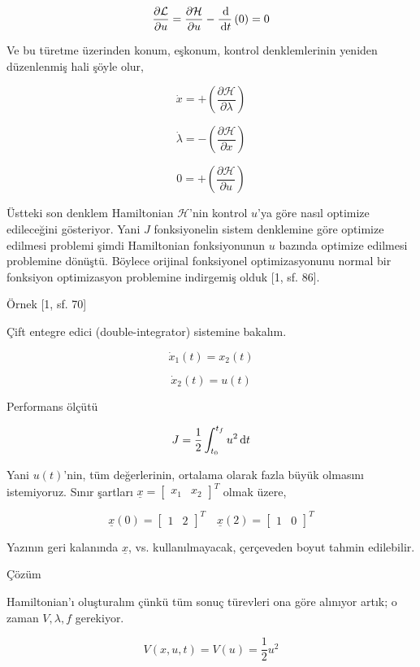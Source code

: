 \documentclass[12pt,fleqn]{article}\usepackage{../../common}
\begin{document}
$$
\frac{\partial \mathcal{L}}{\partial u} = 
\frac{\partial \mathcal{H}}{\partial u} - 
\frac{\,\mathrm{d}}{\,\mathrm{d} t} \left( 0 \right)   = 0
$$

Ve bu türetme üzerinden konum, eşkonum, kontrol denklemlerinin yeniden
düzenlenmiş hali şöyle olur,

$$
\dot{x} = + \left( \frac{\partial \mathcal{H}}{\partial \lambda} \right)
$$

$$
\dot{\lambda} = - \left( \frac{\partial \mathcal{H}}{\partial x} \right)
$$

$$
0 = + \left( \frac{\partial \mathcal{H}}{\partial u} \right)
$$


Üstteki son denklem Hamiltonian $\mathcal{H}$'nin kontrol $u$'ya göre
nasıl optimize edileceğini gösteriyor. Yani $J$ fonksiyonelin sistem
denklemine göre optimize edilmesi problemi şimdi Hamiltonian
fonksiyonunun $u$ bazında optimize edilmesi problemine
dönüştü. Böylece orijinal fonksiyonel optimizasyonunu normal bir
fonksiyon optimizasyon problemine indirgemiş olduk [1, sf. 86].

Örnek [1, sf. 70]

Çift entegre edici (double-integrator) sistemine bakalım. 

$$
\dot{x}_1(t) = x_2(t)
$$

$$
\dot{x}_2(t) = u(t)
$$

Performans ölçütü 

$$
J = \frac{1}{2} \int_{t_0}^{t_f} u^2 \,\mathrm{d} t
$$

Yani $u(t)$'nin, tüm değerlerinin, ortalama olarak fazla büyük
olmasını istemiyoruz. Sınır şartları $\underline{x} =
\left[\begin{array}{cc} x_1 & x_2 \end{array}\right]^T$ 
olmak üzere,

$$
\underline{x}(0) = \left[\begin{array}{cc} 1 & 2 \end{array}\right]^T \quad 
\underline{x}(2) = \left[\begin{array}{cc} 1 & 0 \end{array}\right]^T 
$$

Yazının geri kalanında $\underline{x}$, vs. kullanılmayacak, çerçeveden
boyut tahmin edilebilir.

Çözüm

Hamiltonian'ı oluşturalım çünkü tüm sonuç türevleri ona göre alınıyor
artık; o zaman $V,\lambda,f$ gerekiyor. 

$$
V(x,u,t) = V(u) = \frac{1}{2} u^2
$$
\end{document}
